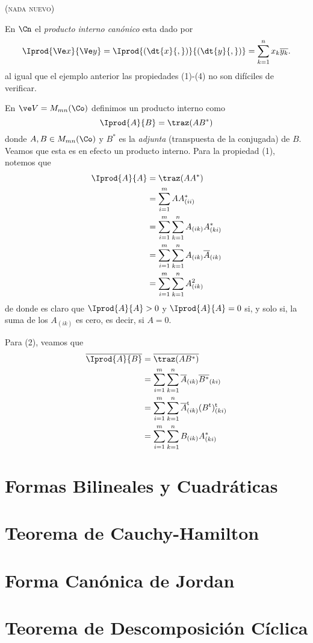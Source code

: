 ({\scshape nada nuevo})
\begin{ejem}
	En $\Cn$ el \emph{producto interno canónico} esta dado por
	\[ \Iprod{\Ve x}{\Ve y} = \Iprod{(\dt{x}{,})}{(\dt{y}{,})} = \sum_{k=1}^{n} x_k\overline{y_k}.\]
	al igual que el ejemplo anterior las propiedades (1)-(4) no son difíciles de verificar.
\end{ejem}
\begin{ejem}
	En $\ve V= M_{mn}(\Co)$ definimos un producto interno como
	\[ \Iprod{A}{B} = \traz(AB^\ast) \]
	donde $A,B\in M_{mn}(\Co)$ y $B^\ast$ es la \emph{adjunta} (transpuesta de la conjugada) de $B$. Veamos que esta es en efecto un producto interno.
	Para la propiedad (1), notemos que
	\begin{align*}
		\Iprod{A}{A}  &= \traz(AA^\ast) \\
					  &= \sum_{i=1}^{m} AA^\ast_{(ii)} \\
					  &= \sum_{i=1}^{m}\sum_{k=1}^{n} A_{(ik)}A^\ast_{(ki)} \\
					  &= \sum_{i=1}^{m}\sum_{k=1}^{n} A_{(ik)}\overline{A}_{(ik)} \\
					  &= \sum_{i=1}^{m}\sum_{k=1}^{n} A^2_{(ik)}
	\end{align*}
	de donde es claro que $\Iprod{A}{A}>0$ y $\Iprod{A}{A} = 0$ si, y solo si, la suma de los $A_{(ik)}$ es cero, es decir, si $A=0$.
	
	Para (2), veamos que
	\begin{align*}
		\overline{\Iprod{A}{B}} &= \overline{\traz(AB^\ast)} \\
					 			&= \sum_{i=1}^{m}\sum_{k=1}^{n} \overline{A}_{(ik)}\overline{B^\ast}_{(ki)} \\
					 			&= \sum_{i=1}^{m}\sum_{k=1}^{n} \overline{A}_{(ik)}^\mathrm t(B^\mathrm t)^\mathrm t_{(ki)} \\
					 			&= \sum_{i=1}^{m}\sum_{k=1}^{n} B_{(ik)}A_{(ki)}^\ast
	\end{align*}
\end{ejem}
\chapter[formas bilineales y cuadráticas]{Formas Bilineales y Cuadráticas}

\chapter[teorema de cauchy-hamilton]{Teorema de Cauchy-Hamilton}

\chapter[forma canónica de jordan]{Forma Canónica de Jordan}

\chapter[teorema de descomposición cíclica]{Teorema de Descomposición Cíclica}

\backmatter
